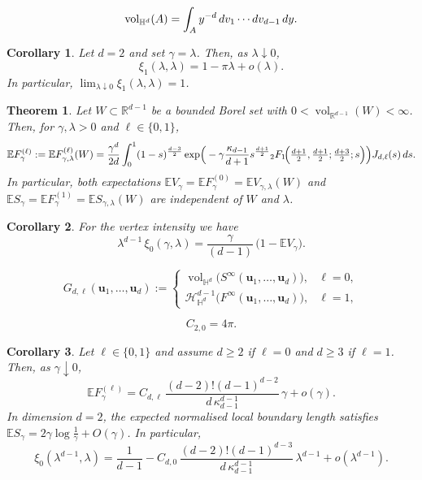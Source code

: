 \documentclass[10pt,a4paper]{amsart}
\newtheorem{corollary}{Corollary}
\newtheorem{theorem}{Theorem}
\def\EE{\mathbb{E}}
\def\HH{\mathbb{H}}
\def\RR{\mathbb{R}}
\newcommand{\bu}{\boldsymbol{u}}
\def\cH{\mathcal{H}}
\newcommand{\dint}{\textup{d}}
\newcommand{\vol}{\mathop{\mathrm{vol}}\nolimits}
\begin{document}
\begin{equation}\label{eq:HyperbolicVolume}
	\vol_{\HH^d}(A)
	= \int_A y^{-d}\,\dint v_1\cdots\dint v_{d-1}\,\dint y.
\end{equation}

\begin{corollary}\label{cor:lambda_asymptotics_d2}
	Let $d=2$ and set $\gamma=\lambda$. Then, as $\lambda\downarrow 0$,
	\[
		\xi_1(\lambda,\lambda)
		=1-\pi\lambda+o(\lambda).
	\]
	In particular, $\lim_{\lambda\downarrow 0}\xi_1(\lambda,\lambda)=1$.
\end{corollary}

\begin{theorem}\label{thm:LocalVolume}
	Let $W\subset\RR^{d-1}$ be a bounded Borel set with
	$0<\vol_{\RR^{d-1}}(W)<\infty$. Then, for
	$\gamma,\lambda>0$ and $\ell\in\{0,1\}$,
	\[
		\EE F_{\gamma}^{(\ell)}:=\EE F_{\gamma,\lambda}^{(\ell)}(W)
		=
		\frac{\gamma^d}{2d}
		\int_0^1
		(1-s)^{\frac{d-3}{2}}
		\exp\!\Big(
		-\gamma\frac{\kappa_{d-1}}{d+1}
		s^{\frac{d+1}{2}}
		{}_2F_1\!\Big(
		\tfrac{d+1}{2},\tfrac{d+1}{2};
		\tfrac{d+3}{2};s
		\Big)
		\Big)
		J_{d,\ell}(s)\,\dint s.
	\]
	In particular, both expectations $\EE V_{\gamma}=\EE F_{\gamma}^{(0)}=\EE V_{\gamma,\lambda}(W)$ and $\EE S_{\gamma}=\EE F_{\gamma}^{(1)}=\EE S_{\gamma,\lambda}(W)$ are independent of $W$ and
	$\lambda$.
\end{theorem}

\begin{corollary}\label{cor:Efron}
	For the vertex intensity we have
	\[
		\lambda^{d-1}\, \xi_0(\gamma,\lambda)
		=\frac{\gamma}{(d-1)}\,
		\bigl(1- \EE V_{\gamma}\bigr).
	\]
\end{corollary}

\begin{equation}\label{eq:Gdl}
	G_{d,\ell}(\bu_1,\ldots,\bu_d)
	:=
	\begin{cases}
		\vol_{\HH^d}\bigl(
		S^\infty(\bu_1,\ldots,\bu_d)
		\bigr), & \ell=0, \\[1mm]
		\cH_{\HH^d}^{d-1}\bigl(
		F^\infty(\bu_1,\ldots,\bu_d)
		\bigr), & \ell=1,
	\end{cases}
\end{equation}

\begin{equation}\label{eq:C20}
	C_{2,0}=4\pi.
\end{equation}

\begin{corollary}\label{cor:LocalVolumeAsymptotics}
	Let $\ell\in\{0,1\}$ and assume $d\geq 2$ if $\ell=0$ and $d\geq 3$ if $\ell=1$. Then, as $\gamma\downarrow0$,
	\[
		\EE F^{(\ell)}_{\gamma}
		=
		C_{d,\ell}\,
		\frac{(d-2)!(d-1)^{d-2}}{d\,\kappa_{d-1}^{d-1}}\,
		\gamma
		+
		o(\gamma).
	\]
	In dimension $d=2$, the expected normalised local boundary length satisfies $\EE S_{\gamma}=2\gamma\log\frac{1}{\gamma}+O(\gamma)$.
	In particular,
	\[
		\xi_0(\lambda^{d-1},\lambda)
		=
		\frac{1}{d-1}
		-
		C_{d,0}\,
		\frac{(d-2)!(d-1)^{d-3}}{d\,\kappa_{d-1}^{d-1}}\,
		\lambda^{d-1}
		+
		o(\lambda^{d-1}).
	\]
\end{corollary}
\end{document}
